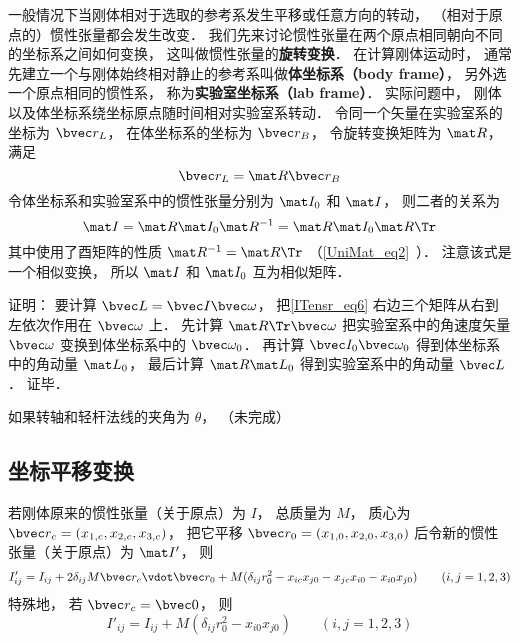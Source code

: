 一般情况下当刚体相对于选取的参考系发生平移或任意方向的转动， （相对于原点的）惯性张量都会发生改变．  我们先来讨论惯性张量在两个原点相同朝向不同的坐标系之间如何变换， 这叫做惯性张量的\textbf{旋转变换}． 在计算刚体运动时， 通常先建立一个与刚体始终相对静止的参考系叫做\textbf{体坐标系（body frame）}， 另外选一个原点相同的惯性系， 称为\textbf{实验室坐标系（lab frame）}． 实际问题中， 刚体以及体坐标系绕坐标原点随时间相对实验室系转动． 令同一个矢量在实验室系的坐标为 $\bvec r_{L}$， 在体坐标系的坐标为 $\bvec r_{B}$， 令旋转变换矩阵为 $\mat R$， 满足
\begin{equation}
\bvec r_L = \mat R\bvec r_B
\end{equation}
令体坐标系和实验室系中的惯性张量分别为 $\mat I_0$ 和 $\mat I$， 则二者的关系为
\begin{equation}\label{ITensr_eq6}
\mat I = \mat R \mat I_0 \mat R^{-1} = \mat R \mat I_0 \mat R\Tr
\end{equation}
其中使用了酉矩阵的性质 $\mat R^{-1} = \mat R\Tr$ （\autoref{UniMat_eq2}~）． 注意该式是一个相似变换， 所以 $\mat I$ 和 $\mat I_0$ 互为相似矩阵．

证明： 要计算 $\bvec L = \bvec I \bvec \omega$， 把\autoref{ITensr_eq6} 右边三个矩阵从右到左依次作用在 $\bvec \omega$ 上． 先计算 $\mat R\Tr \bvec \omega$ 把实验室系中的角速度矢量 $\bvec \omega$ 变换到体坐标系中的 $\bvec \omega_0$． 再计算 $\bvec I_0 \bvec \omega_0$ 得到体坐标系中的角动量 $\mat L_0$， 最后计算 $\mat R \mat L_0$ 得到实验室系中的角动量 $\bvec L$． 证毕．

\begin{example}{}
如果转轴和轻杆法线的夹角为 $\theta$， （未完成）
\end{example}

\subsection{坐标平移变换}
若刚体原来的惯性张量（关于原点）为 $I$， 总质量为 $M$， 质心为 $\bvec r_c = (x_{1,c}, x_{2,c}, x_{3,c})$， 把它平移 $\bvec r_0 = (x_{1,0}, x_{2,0}, x_{3,0})$ 后令新的惯性张量（关于原点）为 $\mat I'$， 则
\begin{equation}\label{ITensr_eq7}
I'_{ij} = I_{ij} + 2 \delta_{ij} M\bvec r_c\vdot \bvec r_0 + M(\delta_{ij}r_0^2 - x_{ic}x_{j0} - x_{jc}x_{i0} - x_{i0}x_{j0})\qquad (i, j = 1, 2, 3)
\end{equation}
特殊地， 若 $\bvec r_c = \bvec 0$， 则
\begin{equation}
I'_{ij} = I_{ij} + M(\delta_{ij}r_0^2 - x_{i0}x_{j0})\qquad (i, j = 1, 2, 3)
\end{equation}


